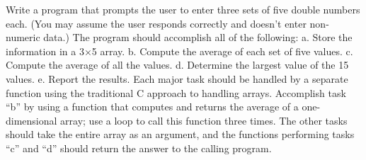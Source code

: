 \begin{question}
Write a program that prompts the user to enter three sets of five double numbers each.
(You may assume the user responds correctly and doesn’t enter non-numeric data.) The
program should accomplish all of the following:
a. Store the information in a 3×5 array.
b. Compute the average of each set of five values.
c. Compute the average of all the values.
d. Determine the largest value of the 15 values.
e. Report the results.
Each major task should be handled by a separate function using the traditional C
approach to handling arrays. Accomplish task “b” by using a function that computes
and returns the average of a one-dimensional array; use a loop to call this function three
times. The other tasks should take the entire array as an argument, and the functions
performing tasks “c” and “d” should return the answer to the calling program.
\end{question}
